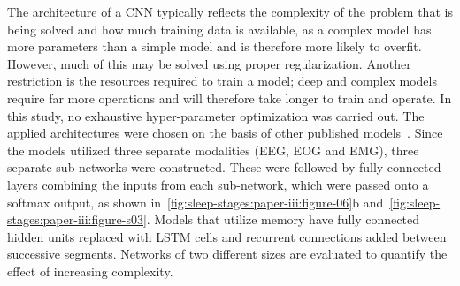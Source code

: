 The architecture of a \ac{CNN} typically reflects the complexity of the problem that is being solved and how much training data is available, as a complex model has more parameters than a simple model and is therefore more likely to overfit.
However, much of this may be solved using proper regularization. 
Another restriction is the resources required to train a model; deep and complex models require far more operations and will therefore take longer to train and operate. 
In this study, no exhaustive hyper-parameter optimization was carried out. 
The applied architectures were chosen on the basis of other published models~\cite{Simonyan2015}. 
Since the models utilized three separate modalities (\ac{EEG}, \ac{EOG} and \ac{EMG}), three separate sub-networks were constructed. 
These were followed by fully connected layers combining the inputs from each sub-network, which were passed onto a softmax output, as shown in~\cref{fig:sleep-stages:paper-iii:figure-06}b and~\cref{fig:sleep-stages:paper-iii:figure-s03}. 
Models that utilize memory have fully connected hidden units replaced with \ac{LSTM} cells and recurrent connections added between successive segments. 
Networks of two different sizes are evaluated to quantify the effect of increasing complexity. 

